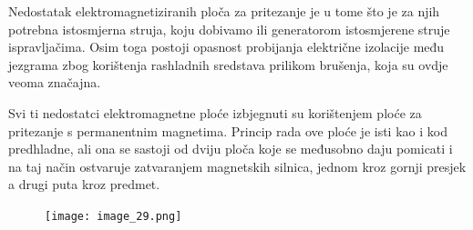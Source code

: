 \documentclass[a4paper,12pt]{article}
\numberwithin{figure}{section}
\begin{document}
Nedostatak elektromagnetiziranih ploča za pritezanje je u tome što je za njih potrebna istosmjerna struja, koju dobivamo ili generatorom istosmjerene struje ispravljačima. Osim toga postoji opasnost probijanja električne izolacije među jezgrama zbog korištenja rashladnih sredstava prilikom brušenja, koja su ovdje veoma značajna.\par
Svi ti nedostatci elektromagnetne ploće izbjegnuti su korištenjem ploće za pritezanje s permanentnim magnetima. Princip rada ove ploće je isti kao i kod predhladne, ali ona se sastoji od dviju ploča koje se međusobno daju pomicati i na taj način ostvaruje zatvaranjem magnetskih silnica, jednom kroz gornji presjek a drugi puta kroz predmet. 
\begin{figure}[!h]
\centering
\texttt{[image: image\_29.png]}
\end{figure}
\FloatBarrier
\end{document}
